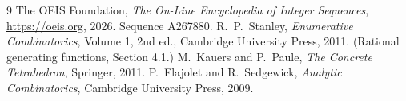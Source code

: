 \documentclass[11pt,a4paper]{article}
\theoremstyle{plain}
\theoremstyle{definition}
\begin{document}
\begin{thebibliography}{9}
 The OEIS Foundation, \emph{The On-Line Encyclopedia of Integer
Sequences}, \url{https://oeis.org}, 2026. Sequence A267880.
 R.~P.~Stanley, \emph{Enumerative Combinatorics}, Volume 1, 2nd ed.,
Cambridge University Press, 2011. (Rational generating functions, Section 4.1.)
 M.~Kauers and P.~Paule, \emph{The Concrete Tetrahedron}, Springer, 2011.
 P.~Flajolet and R.~Sedgewick, \emph{Analytic Combinatorics}, Cambridge
University Press, 2009.
\end{thebibliography}
\end{document}
